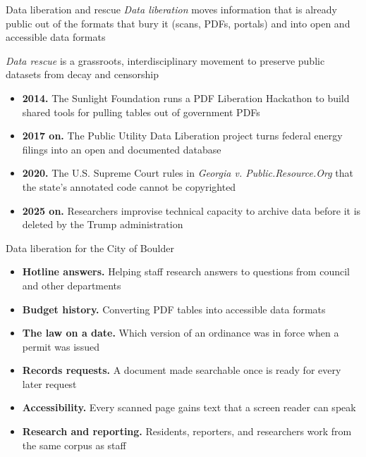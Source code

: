 \documentclass[9pt,aspectratio=169,onlytextwidth]{beamer}
\begin{document}
\begin{frame}{Data liberation and rescue}
    \textit{Data liberation} moves information that is already public out of the formats that bury it (scans, PDFs, portals) and into open and accessible data formats

    \medskip

    \textit{Data rescue} is a grassroots, interdisciplinary movement to preserve public datasets from decay and censorship

    \medskip

    \begin{itemize}\setlength\itemsep{3pt}
        \item \textbf{2014.} The Sunlight Foundation runs a PDF Liberation Hackathon to build shared tools for pulling tables out of government PDFs
        \item \textbf{2017 on.} The Public Utility Data Liberation project turns federal energy filings into an open and documented database
        \item \textbf{2020.} The U.S. Supreme Court rules in \textit{Georgia v. Public.Resource.Org} that the state's annotated code cannot be copyrighted
        \item \textbf{2025 on.} Researchers improvise technical capacity to archive data before it is deleted by the Trump administration
    \end{itemize}

\end{frame}

\begin{frame}{Data liberation for the City of Boulder}
    \begin{itemize}\setlength\itemsep{4pt}
        \item \textbf{Hotline answers.} Helping staff research answers to questions from council and other departments
        \item \textbf{Budget history.} Converting PDF tables into accessible data formats
        \item \textbf{The law on a date.} Which version of an ordinance was in force when a permit was issued
        \item \textbf{Records requests.} A document made searchable once is ready for every later request
        \item \textbf{Accessibility.} Every scanned page gains text that a screen reader can speak
        \item \textbf{Research and reporting.} Residents, reporters, and researchers work from the same corpus as staff
    \end{itemize}
\end{frame}
\end{document}

